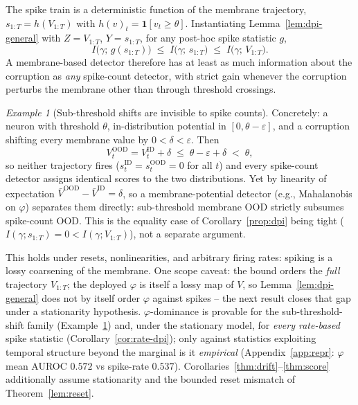﻿\documentclass{article} %
\theoremstyle{remark}
\newtheorem{example}{Example}
\begin{document}
\begin{corollary}
\label{prop:dpi}
The spike train is a deterministic function of the membrane trajectory,
$s_{1:T}=h(V_{1:T})$ with $h(v)_t=\mathbf{1}[v_t\ge\theta]$. Instantiating
Lemma~\ref{lem:dpi-general} with $Z=V_{1:T}$, $Y=s_{1:T}$, for any post-hoc spike statistic $g$,
\begin{equation}
  I\bigl(\gamma;\,g(s_{1:T})\bigr)\;\le\;I\bigl(\gamma;\,s_{1:T}\bigr)\;\le\;I\bigl(\gamma;\,V_{1:T}\bigr).
  \label{eq:dpi}
\end{equation}
A membrane-based detector therefore has at least as much information about the corruption as
\emph{any} spike-count detector, with strict gain whenever the corruption perturbs the membrane
other than through threshold crossings.
\end{corollary}

\begin{example}[Sub-threshold shifts are invisible to spike counts]
\label{prop:spike}
Concretely: a neuron with threshold $\theta$, in-distribution potential in $[0,\theta-\varepsilon]$,
and a corruption shifting every membrane value by $0<\delta<\varepsilon$. Then
\begin{equation}
  V^{\mathrm{OOD}}_t = V^{\mathrm{ID}}_t+\delta \;\le\;\theta-\varepsilon+\delta\;<\;\theta,
  \label{eq:spike-example}
\end{equation}
so neither trajectory fires ($s_t^{\mathrm{ID}}=s_t^{\mathrm{OOD}}=0$ for all $t$) and every
spike-count detector assigns identical scores to the two distributions. Yet by linearity of
expectation $\bar V^{\mathrm{OOD}}-\bar V^{\mathrm{ID}}=\delta$, so a membrane-potential detector
(e.g., Mahalanobis on $\varphi$) separates them directly: sub-threshold membrane OOD strictly
subsumes spike-count OOD. This is the equality case of Corollary~\ref{prop:dpi} being tight
($I(\gamma;s_{1:T})=0<I(\gamma;V_{1:T})$), not a separate argument.
\end{example}

\noindent This holds under resets, nonlinearities, and arbitrary firing rates: spiking is a lossy
coarsening of the membrane. One scope caveat: the bound orders the \emph{full} trajectory
$V_{1:T}$; the deployed $\varphi$ is itself a lossy map of $V$, so Lemma~\ref{lem:dpi-general} does
not by itself order $\varphi$ against spikes -- the next result closes that gap under a stationarity
hypothesis. $\varphi$-dominance is provable for the sub-threshold-shift family
(Example~\ref{prop:spike}) and, under the stationary model, for \emph{every rate-based} spike
statistic (Corollary~\ref{cor:rate-dpi}); only against statistics exploiting temporal structure
beyond the marginal is it \emph{empirical} (Appendix~\ref{app:repr}: $\varphi$ mean AUROC $0.572$ vs
spike-rate $0.537$). Corollaries~\ref{thm:drift}--\ref{thm:score} additionally assume
stationarity and the bounded reset mismatch of Theorem~\ref{lem:reset}.
\end{document}
